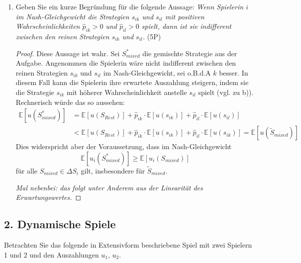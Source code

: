\documentclass[12pt]{article}
\begin{document}
\begin{enumerate}[label=\alph*\upshape)]
\begin{proof}
			Da also nur eine Strategie pro Spieler die Eliminierung von strikt dominierten Strategien überlebt, kann es keine (echt) gemischten Strategien geben.
		\end{proof}
	\item Geben Sie ein kurze Begründung für die folgende Aussage: \textit{Wenn Spielerin $i$ im Nash-Gleichgewicht die Strategien $s_{ik}$ und $s_{il}$ mit positiven Wahrscheinlichkeiten $\hat{p}_{ik} > 0$ und $\hat{p}_{il} > 0$ spielt, dann ist sie indifferent zwischen den reinen Strategien $s_{ik}$ und $s_{il}$.} (5P)
		\begin{proof}
			Diese Aussage ist wahr. Sei $S^*_{mixed}$ die gemischte Strategie aus der Aufgabe. Angenommen die Spielerin wäre nicht indifferent zwischen den reinen Strategien $s_{ik}$ und $s_{il}$ im Nash-Gleichgewicht, sei o.B.d.A $k$ besser. In diesem Fall kann die Spielerin ihre erwartete Auszahlung steigern, indem sie die Strategie $s_{ik}$ mit höherer Wahrscheinlichkeit anstelle $s_{il}$ spielt (vgl. zu b)). Rechnerisch würde das so aussehen:
			\begin{align*}
				\mathbb{E}[u(S^*_{mixed})] & = \mathbb{E}[u(S_{Rest})] + \hat{p}_{ik} \cdot \mathbb{E}[u(s_{ik})] + \hat{p}_{il} \cdot \mathbb{E}[u(s_{il})] \\
				& < \mathbb{E}[u(S_{Rest})] +\hat{p}_{ik} \cdot \mathbb{E}[u(s_{ik})] + \hat{p}_{il} \cdot \mathbb{E}[u(s_{ik})] = \mathbb{E}[u(\tilde{S}_{mixed})]
			\end{align*}
			Dies widerspricht aber der Voraussetzung, dass im Nash-Gleichgewicht 
			$$ \mathbb{E}[u_i(S^*_{mixed})] \geq \mathbb{E}[u_i(S_{mixed})]  $$
			für alle $S_{mixed} \in \Delta S_i$ gilt, insbesondere für $\tilde{S}_{mixed}$. ~\smallskip
			
			\textit{Mal nebenbei: das folgt unter Anderem aus der Linearität des Erwartungswertes.}
		\end{proof}
\end{enumerate}

\newpage

\subsection*{2. Dynamische Spiele}

Betrachten Sie das folgende in Extensivform beschriebene Spiel mit zwei Spielern 1 und 2 und den Auszahlungen $u_1$, $u_2$.

\end{document}
